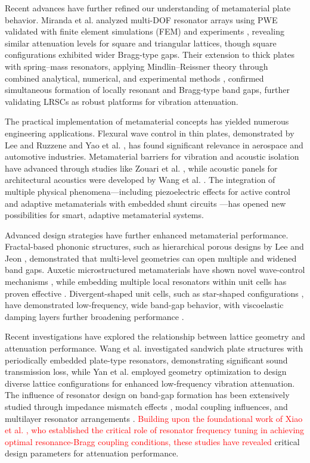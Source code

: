 \documentclass[review,numbers,sort&compress]{elsarticle}
\begin{document}
Recent advances have further refined our understanding of metamaterial plate behavior. Miranda et al. analyzed multi-DOF resonator arrays using PWE validated with finite element simulations (FEM) and experiments \cite{MIRANDA2019480}, revealing similar attenuation levels for square and triangular lattices, though square configurations exhibited wider Bragg-type gaps. Their extension to thick plates with spring--mass resonators, applying Mindlin--Reissner theory through combined analytical, numerical, and experimental methods \cite{MIRANDAJR2020138}, confirmed simultaneous formation of locally resonant and Bragg-type band gaps, further validating LRSCs as robust platforms for vibration attenuation.


The practical implementation of metamaterial concepts has yielded numerous engineering applications. Flexural wave control in thin plates, demonstrated by Lee and Ruzzene \cite{Lee2015} and Yao et al. \cite{Yao2014}, has found significant relevance in aerospace and automotive industries. Metamaterial barriers for vibration and acoustic isolation have advanced through studies like Zouari et al. \cite{Zouari2018}, while acoustic panels for architectural acoustics were developed by Wang et al. \cite{Wang2020}. The integration of multiple physical phenomena---including piezoelectric effects for active control \cite{Torrent2013} and adaptive metamaterials with embedded shunt circuits \cite{Lera2019}---has opened new possibilities for smart, adaptive metamaterial systems.

Advanced design strategies have further enhanced metamaterial performance. Fractal-based phononic structures, such as hierarchical porous designs by Lee and Jeon \cite{Lee2020}, demonstrated that multi-level geometries can open multiple and widened band gaps. Auxetic microstructured metamaterials have shown novel wave-control mechanisms \cite{ZhiTao2022}, while embedding multiple local resonators within unit cells has proven effective \cite{DalPoggetto2021}. Divergent-shaped unit cells, such as star-shaped configurations \cite{Kumar2019}, have demonstrated low-frequency, wide band-gap behavior, with viscoelastic damping layers further broadening performance \cite{DalPoggetto2021}.

Recent investigations have explored the relationship between lattice geometry and attenuation performance. Wang et al. \cite{Wang2021} investigated sandwich plate structures with periodically embedded plate-type resonators, demonstrating significant sound transmission loss, while Yan et al. \cite{Yan2022} employed geometry optimization to design diverse lattice configurations for enhanced low-frequency vibration attenuation. The influence of resonator design on band-gap formation has been extensively studied through impedance mismatch effects \cite{Li2021}, modal coupling influences, and multilayer resonator arrangements \cite{Wei2021}. \textcolor{red}{Building upon the foundational work of Xiao et al. \cite{Xiao_2012}, who established the critical role of resonator frequency tuning in achieving optimal resonance-Bragg coupling conditions, these studies have revealed} critical design parameters for attenuation performance.
\end{document}
